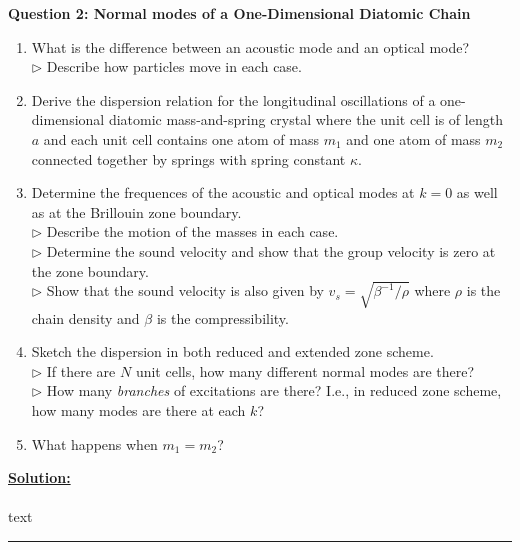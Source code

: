\documentclass[11pt]{article}
\begin{document}
\begin{bluebox}
  \textbf{Question 2: Normal modes of a One-Dimensional Diatomic Chain} 
  \begin{enumerate}[label=(\alph*)]
    \item What is the difference between an acoustic mode and an optical mode? \\
    $\triangleright$ Describe how particles move in each case.

    \item Derive the dispersion relation for the longitudinal oscillations of a one-dimensional diatomic mass-and-spring crystal where the unit cell is of length $a$ and each unit cell contains one atom of mass $m_1$ and one atom of mass $m_2$ connected together by springs with spring constant $\kappa$.
    
    \item Determine the frequences of the acoustic and optical modes at $k = 0$ as well as at the Brillouin zone boundary.\\
    $\triangleright$ Describe the motion of the masses in each case. \\
    $\triangleright$ Determine the sound velocity and show that the group velocity is zero at the zone boundary.\\
    $\triangleright$ Show that the sound velocity is also given by $v_s = \sqrt{\beta^{-1}/\rho}$ where $\rho$ is the chain density and $\beta$ is the compressibility.
    
    \item Sketch the dispersion in both reduced and extended zone scheme. \\
    $\triangleright$ If there are $N$ unit cells, how many different normal modes are there? \\
    $\triangleright$ How many \emph{branches} of excitations are there? I.e., in reduced zone scheme, how many modes are there at each $k$?

    \item What happens when $m_1 = m_2$?
  \end{enumerate}
\end{bluebox}

\vskip 0.5cm
\textbf{\underline{Solution:}}
\\
\\
text
\vskip 0.5cm
\hrule
\pagebreak


\end{document}
